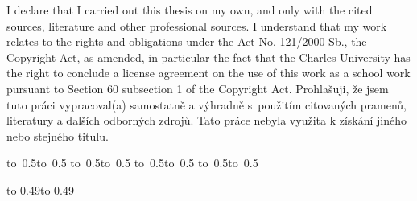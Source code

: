 \ifEN
\noindent
I declare that I carried out this \ThesisAccusative thesis on my own, and only with the cited sources, literature and other professional sources. I understand that my work relates to the rights and obligations under the Act No. 121/2000 Sb., the Copyright Act, as amended, in particular the fact that the Charles University has the right to conclude a license agreement on the use of this work as a school work pursuant to Section 60 subsection 1 of the Copyright Act.
\else
\noindent
Prohlašuji, že jsem tuto \ThesisAccusative práci vypracoval(a) samostatně a výhradně
s~použitím citovaných pramenů, literatury a dalších odborných zdrojů.
Tato práce nebyla využita k získání jiného nebo stejného titulu.
\fi

\vspace{10mm}


\ifEN
\hbox{\hbox to 0.5\hbox to 0.5\hsize{\dotfill\quad}}
\smallskip
\hbox{\hbox to 0.5\hsize{}\hbox to 0.5}
\else
\hbox{\hbox to 0.5\hbox to 0.5\hsize{\dotfill\quad}}
\smallskip
\hbox{\hbox to 0.5\hsize{}\hbox to 0.5}
\fi

\vspace{20mm}
\newpage


\openright

\noindent
\Dedication

\newpage


\openright

\vbox to 0.49\ifEN\relax\else\nobreak\vbox to 0.49
\fi

\newpage

\openright
\pagestyle{plain}
\setcounter{page}{1}
